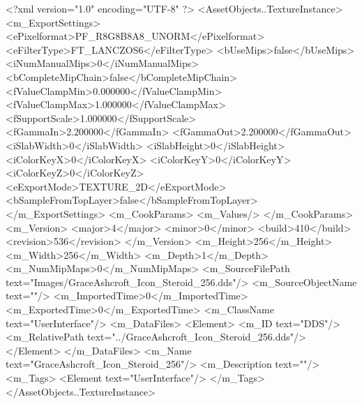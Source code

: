 <?xml version="1.0" encoding="UTF-8" ?>
<AssetObjects..TextureInstance>
	<m_ExportSettings>
		<ePixelformat>PF_R8G8B8A8_UNORM</ePixelformat>
		<eFilterType>FT_LANCZOS6</eFilterType>
		<bUseMips>false</bUseMips>
		<iNumManualMips>0</iNumManualMips>
		<bCompleteMipChain>false</bCompleteMipChain>
		<fValueClampMin>0.000000</fValueClampMin>
		<fValueClampMax>1.000000</fValueClampMax>
		<fSupportScale>1.000000</fSupportScale>
		<fGammaIn>2.200000</fGammaIn>
		<fGammaOut>2.200000</fGammaOut>
		<iSlabWidth>0</iSlabWidth>
		<iSlabHeight>0</iSlabHeight>
		<iColorKeyX>0</iColorKeyX>
		<iColorKeyY>0</iColorKeyY>
		<iColorKeyZ>0</iColorKeyZ>
		<eExportMode>TEXTURE_2D</eExportMode>
		<bSampleFromTopLayer>false</bSampleFromTopLayer>
	</m_ExportSettings>
	<m_CookParams>
		<m_Values/>
	</m_CookParams>
	<m_Version>
		<major>4</major>
		<minor>0</minor>
		<build>410</build>
		<revision>536</revision>
	</m_Version>
	<m_Height>256</m_Height>
	<m_Width>256</m_Width>
	<m_Depth>1</m_Depth>
	<m_NumMipMaps>0</m_NumMipMaps>
	<m_SourceFilePath text="Images/GraceAshcroft_Icon_Steroid_256.dds"/>
	<m_SourceObjectName text=""/>
	<m_ImportedTime>0</m_ImportedTime>
	<m_ExportedTime>0</m_ExportedTime>
	<m_ClassName text="UserInterface"/>
	<m_DataFiles>
		<Element>
			<m_ID text="DDS"/>
			<m_RelativePath text="../GraceAshcroft_Icon_Steroid_256.dds"/>
		</Element>
	</m_DataFiles>
	<m_Name text="GraceAshcroft_Icon_Steroid_256"/>
	<m_Description text=""/>
	<m_Tags>
		<Element text="UserInterface"/>
	</m_Tags>
</AssetObjects..TextureInstance>
